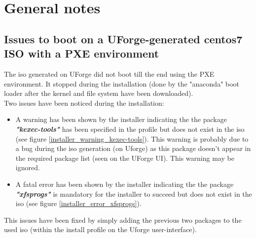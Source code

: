 \documentclass[12pt]{article}											%
\begin{document}
\section{General notes}
\subsection{Issues to boot on a UForge-generated centos7 ISO with a PXE environment}
	The iso generated on UForge did not boot till the end using the PXE environment.   It stopped during the installation (done by the "anaconda" boot loader after the kernel and file system have been downloaded).\\
	Two issues have been noticed during the installation:
	\begin{itemize}
		\item A warning has been shown by the installer indicating the the package \textit{\textbf{"kexec-tools"}} has been specified in the profile but does not exist in the iso (see figure \ref{installer_warning_kexec-tools}).  This warning is probably due to a bug during the iso generation (on Uforge) as this package doesn't appear in the required package list (seen on the UForge UI).   This warning may be ignored.
		\item A fatal error has been shown by the installer indicating the the package \textit{\textbf{"xfsprogs"}} is mandatory for the installer to succeed but does not exist in the iso (see figure \ref{installer_error_xfsprogs}).
	\end{itemize}
	This issues have been fixed by simply adding the previous two packages to the used iso (within the install profile on the Uforge user-interface).
\end{document}
